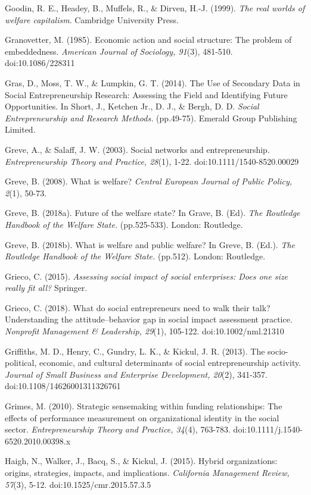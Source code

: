\documentclass{article}
\begin{document}
Goodin, R. E., Headey, B., Muffels, R., \& Dirven, H.-J. (1999). \emph{The real worlds of welfare capitalism}. Cambridge University Press.

Granovetter, M. (1985). Economic action and social structure: The problem of embeddedness. \emph{American Journal of Sociology, 91}(3), 481-510. doi:10.1086/228311

Gras, D., Moss, T. W., \& Lumpkin, G. T. (2014). The Use of Secondary Data in Social Entrepreneurship Research: Assessing the Field and Identifying Future Opportunities. In Short, J., Ketchen Jr., D. J., \& Bergh, D. D. \emph{Social Entrepreneurship and Research Methods.} (pp.49-75). Emerald Group Publishing Limited.

Greve, A., \& Salaff, J. W. (2003). Social networks and entrepreneurship. \emph{Entrepreneurship Theory and Practice, 28}(1), 1-22. doi:10.1111/1540-8520.00029

Greve, B. (2008). What is welfare? \emph{Central European Journal of Public Policy, 2}(1), 50-73. 

Greve, B. (2018a). Future of the welfare state? In Grave, B. (Ed). \emph{The Routledge Handbook of the Welfare State.} (pp.525-533). London: Routledge.

Greve, B. (2018b). What is welfare and public welfare? In Greve, B. (Ed.). \emph{The Routledge Handbook of the Welfare State.} (pp.512). London: Routledge.

Grieco, C. (2015). \emph{Assessing social impact of social enterprises: Does one size really fit all?} Springer.

Grieco, C. (2018). What do social entrepreneurs need to walk their talk? Understanding the attitude--behavior gap in social impact assessment practice. \emph{Nonprofit}\emph{ Management \& Leadership, 29}(1), 105-122. doi:10.1002/nml.21310

Griffiths, M. D., Henry, C., Gundry, L. K., \& Kickul, J. R. (2013). The socio-political, economic, and cultural determinants of social entrepreneurship activity. \emph{Journal of Small Business and Enterprise Development, 20}(2), 341-357. doi:10.1108/14626001311326761

Grimes, M. (2010). Strategic sensemaking within funding relationships: The effects of performance measurement on organizational identity in the social sector. \emph{Entrepreneurship Theory and Practice, 34}(4), 763-783. doi:10.1111/j.1540-6520.2010.00398.x

Haigh, N., Walker, J., Bacq, S., \& Kickul, J. (2015). Hybrid organizations: origins, strategies, impacts, and implications. \emph{California Management Review, 57}(3), 5-12. doi:10.1525/cmr.2015.57.3.5
\end{document}
